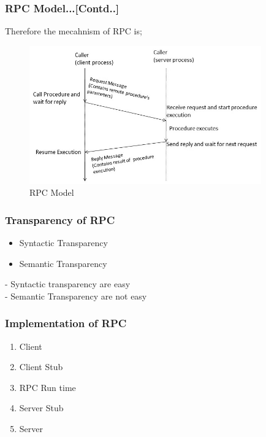 \documentclass{beamer}
\begin{document}
\begin{frame}
	\frametitle{RPC Model...[Contd..]}
	 Therefore the mecahnism of RPC is;
	 \begin{figure}
	 	\centering
	 	\includegraphics[width=10cm]{fig41.jpg}
	 	\caption{RPC Model}
	 \end{figure}
\end{frame}

\begin{frame}
	\frametitle{Transparency of RPC}
	\vspace{0.2cm}
	\begin{itemize}
		\item Syntactic Transparency
		\item Semantic Transparency
	\end{itemize}
	\vspace{0.5cm}
	- Syntactic transparency are easy\\
	- Semantic Transparency are not easy
	\vspace{3cm}
\end{frame}


\begin{frame}
	\frametitle{Implementation of RPC}
	\begin{enumerate}
		\item Client
		\item Client Stub
		\item RPC Run time
		\item Server Stub
		\item Server
	\end{enumerate}
	\vspace{3cm}
\end{frame}
\end{document}
